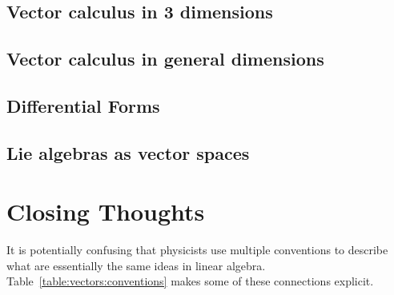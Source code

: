 \documentclass[12pt, oneside]{report}    %
\let\oldsection\section
\def\section{%
  \setcounter{sidenote}{1}%
  \oldsection
}
\begin{document}
\section{Vector calculus in 3 dimensions}
\section{Vector calculus in general dimensions}
\section{Differential Forms}
\section{Lie algebras as vector spaces}


\chapter*{Closing Thoughts}


It is potentially confusing that physicists use multiple conventions to describe what are essentially the same ideas in linear algebra. Table~\ref{table:vectors:conventions} makes some of these connections explicit.
\end{document}
